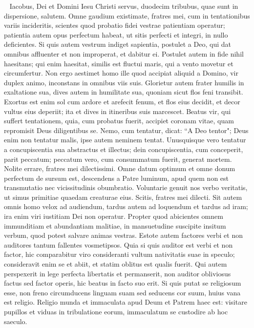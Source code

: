 
\begin{biblechapter}  
\verse Iacobus, Dei et Domini Iesu Christi servus, duodecim tribubus, quae sunt in dispersione, salutem. 
\verse Omne gaudium existimate, fratres mei, cum in tentationibus variis incideritis, 
\verse scientes quod probatio fidei vestrae patientiam operatur; 
\verse patientia autem opus perfectum habeat, ut sitis perfecti et integri, in nullo deficientes. 
\verse Si quis autem vestrum indiget sapientia, postulet a Deo, qui dat omnibus affluenter et non improperat, et dabitur ei. 
\verse Postulet autem in fide nihil haesitans; qui enim haesitat, similis est fluctui maris, qui a vento movetur et circumfertur. 
\verse Non ergo aestimet homo ille quod accipiat aliquid a Domino,  
\verse vir duplex animo, inconstans in omnibus viis suis. 
\verse Glorietur autem frater humilis in exaltatione sua, 
\verse dives autem in humilitate sua, quoniam sicut flos feni transibit. 
\verse Exortus est enim sol cum ardore et arefecit fenum, et flos eius decidit, et decor vultus eius deperiit; ita et dives in itineribus suis marcescet. 
\verse Beatus vir, qui suffert tentationem, quia, cum probatus fuerit, accipiet coronam vitae, quam repromisit Deus diligentibus se. 
\verse Nemo, cum tentatur, dicat: “A Deo tentor"; Deus enim non tentatur malis, ipse autem neminem tentat. 
\verse Unusquisque vero tentatur a concupiscentia sua abstractus et illectus; 
\verse dein concupiscentia, cum conceperit, parit peccatum; peccatum vero, cum consummatum fuerit, generat mortem. 
\verse Nolite errare, fratres mei dilectissimi. 
\verse Omne datum optimum et omne donum perfectum de sursum est, descendens a Patre luminum, apud quem non est transmutatio nec vicissitudinis obumbratio. 
\verse Voluntarie genuit nos verbo veritatis, ut simus primitiae quaedam creaturae eius. 
\verse Scitis, fratres mei dilecti. Sit autem omnis homo velox ad audiendum, tardus autem ad loquendum et tardus ad iram; 
\verse ira enim viri iustitiam Dei non operatur. 
\verse Propter quod abicientes omnem immunditiam et abundantiam malitiae, in mansuetudine suscipite insitum verbum, quod potest salvare animas vestras. 
\verse Estote autem factores verbi et non auditores tantum fallentes vosmetipsos. 
\verse Quia si quis auditor est verbi et non factor, hic comparabitur viro consideranti vultum nativitatis suae in speculo; 
\verse consideravit enim se et abiit, et statim oblitus est qualis fuerit. 
\verse Qui autem perspexerit in lege perfecta libertatis et permanserit, non auditor obliviosus factus sed factor operis, hic beatus in facto suo erit. 
\verse Si quis putat se religiosum esse, non freno circumducens linguam suam sed seducens cor suum, huius vana est religio. 
\verse Religio munda et immaculata apud Deum et Patrem haec est: visitare pupillos et viduas in tribulatione eorum, immaculatum se custodire ab hoc saeculo. 
\end{biblechapter}

